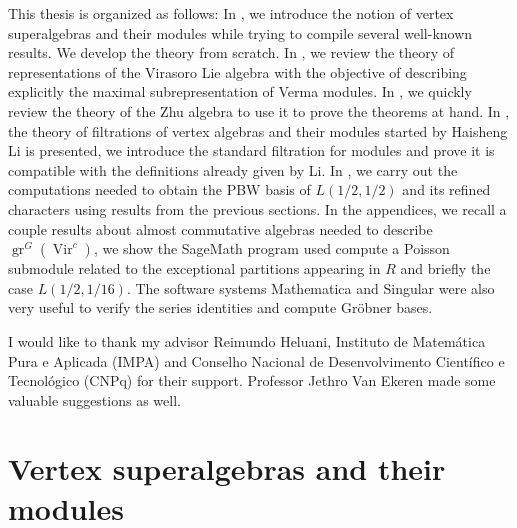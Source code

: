 \documentclass[a4paper, 12pt, reqno]{amsart}
\theoremstyle{remark}
\numberwithin{equation}{subsection}
\DeclareMathOperator{\Vir}{Vir}
\DeclareMathOperator{\gr}{gr}
\begin{document}
This thesis is organized as follows: In , we introduce the notion of vertex superalgebras and their modules while trying to compile several well-known results.
We develop the theory from scratch.
In , we review the theory of representations of the Virasoro Lie algebra with the objective of describing explicitly the maximal subrepresentation of Verma modules.
In , we quickly review the theory of the Zhu algebra to use it to prove the theorems at hand.
In , the theory of filtrations of vertex algebras and their modules started by Haisheng Li is presented, we introduce the standard filtration for modules and prove it is compatible with the definitions already given by Li.
In , we carry out the computations needed to obtain the PBW basis of $L(1/2, 1/2)$ and its refined characters using results from the previous sections.
In the appendices, we recall a couple results about almost commutative algebras needed to describe $\gr^G(\Vir^c)$, we show the SageMath \cite{sagemath} program used compute a Poisson submodule related to the exceptional partitions appearing in $R$ and briefly the case $L(1/2, 1/16)$.
The software systems Mathematica \cite{Mathematica} and Singular \cite{Singular} were also very useful to verify the series identities and compute Gr\"{o}bner bases.

I would like to thank my advisor Reimundo Heluani, Instituto de Matemática Pura e Aplicada (IMPA) and Conselho Nacional de Desenvolvimento Científico e Tecnológico (CNPq) for their support.
Professor Jethro Van Ekeren made some valuable suggestions as well.


\section{Vertex superalgebras and their modules}
\label{sec:vert-supera-their}
\end{document}
